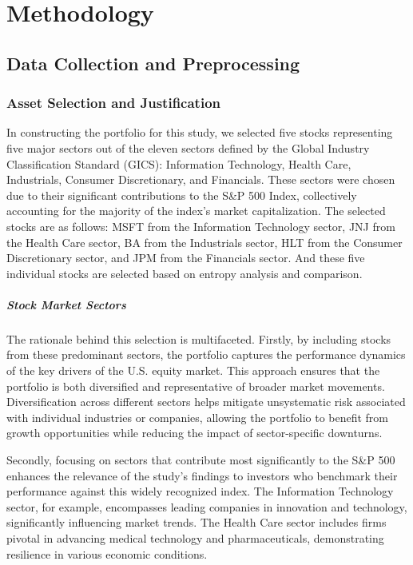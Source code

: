
\chapter{Methodology}\label{chapter:methodology}

\section{Data Collection and Preprocessing}

\subsection{Asset Selection and Justification}


In constructing the portfolio for this study, we selected five stocks representing five major sectors out of the eleven sectors defined by the Global Industry Classification Standard (GICS): Information Technology, Health Care, Industrials, Consumer Discretionary, and Financials. These sectors were chosen due to their significant contributions to the S\&P 500 Index, collectively accounting for the majority of the index's market capitalization. The selected stocks are as follows: \ac{MSFT} from the Information Technology sector, \ac{JNJ} from the Health Care sector, \ac{BA} from the Industrials sector, \ac{HLT} from the Consumer Discretionary sector, and \ac{JPM} from the Financials sector. And these five individual stocks are selected based on entropy analysis and comparison.

\paragraph{Stock Market Sectors}
The rationale behind this selection is multifaceted. Firstly, by including stocks from these predominant sectors, the portfolio captures the performance dynamics of the key drivers of the U.S. equity market. This approach ensures that the portfolio is both diversified and representative of broader market movements. Diversification across different sectors helps mitigate unsystematic risk associated with individual industries or companies, allowing the portfolio to benefit from growth opportunities while reducing the impact of sector-specific downturns.

Secondly, focusing on sectors that contribute most significantly to the S\&P 500 enhances the relevance of the study's findings to investors who benchmark their performance against this widely recognized index. The Information Technology sector, for example, encompasses leading companies in innovation and technology, significantly influencing market trends. The Health Care sector includes firms pivotal in advancing medical technology and pharmaceuticals, demonstrating resilience in various economic conditions.

